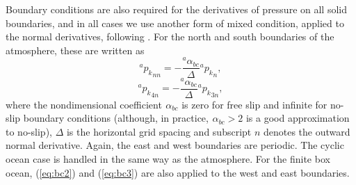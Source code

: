 \documentclass[11pt, a4paper,twoside]{article}
\newcommand{\p}[2]{{{}^{#1}p_{#2}}}
\newcommand{\alphbc}[1]{{}^{#1}\alpha_{bc}}
\numberwithin{equation}{section}
\begin{document}
Boundary conditions are also required for the derivatives of pressure on all solid boundaries, and in all cases we use another form of mixed condition, applied to the normal derivatives, following \citet{haidvogel:92}.
For the north and south boundaries of the atmosphere, these are written as
\begin{equation}\label{eq:bc2}
\p{a}{k}_{nn} = -  \frac{\alphbc{a}}{\Delta} \p{a}{k}_n,
\end{equation}
\begin{equation}\label{eq:bc3}
\p{a}{k}_{4n} = - \frac{\alphbc{a}}{\Delta} \p{a}{k}_{3n},
\end{equation}
where the nondimensional coefficient $\alphbc{}$ is zero for free slip and infinite for no-slip boundary conditions (although, in practice, $\alphbc{}>2$ is a good approximation to no-slip), $\Delta$ is the horizontal grid spacing and subscript $n$ denotes the outward normal derivative.
Again, the east and west boundaries are periodic. 
The cyclic ocean case is handled in the same way as the atmosphere. For the finite box ocean, (\ref{eq:bc2}) and (\ref{eq:bc3}) are also applied to the west and east boundaries.
\end{document}
